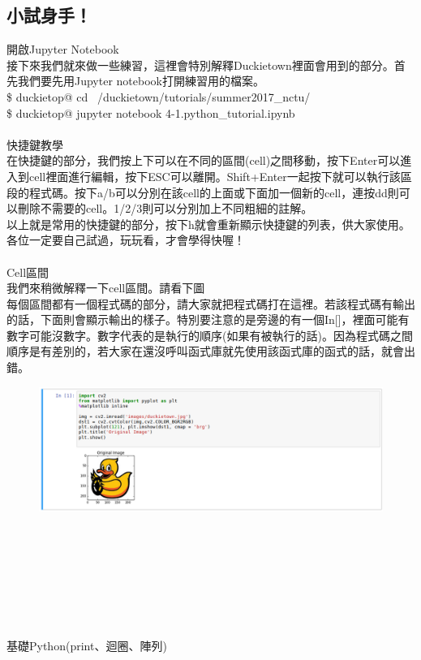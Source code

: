\documentclass{article}
\begin{document}
\subsection{小試身手！}
開啟Jupyter Notebook
\\接下來我們就來做一些練習，這裡會特別解釋Duckietown裡面會用到的部分。首先我們要先用Jupyter notebook打開練習用的檔案。
\\\$ duckietop@ cd ~/duckietown/tutorials/summer2017\_nctu/
\\\$ duckietop@ jupyter notebook 4-1.python\_tutorial.ipynb
\\\\快捷鍵教學
\\在快捷鍵的部分，我們按上下可以在不同的區間(cell)之間移動，按下Enter可以進入到cell裡面進行編輯，按下ESC可以離開。Shift+Enter一起按下就可以執行該區段的程式碼。按下a/b可以分別在該cell的上面或下面加一個新的cell，連按dd則可以刪除不需要的cell。1/2/3則可以分別加上不同粗細的註解。
\\以上就是常用的快捷鍵的部分，按下h就會重新顯示快捷鍵的列表，供大家使用。各位一定要自己試過，玩玩看，才會學得快喔！
\\\\Cell區間
\\我們來稍微解釋一下cell區間。請看下圖
\\每個區間都有一個程式碼的部分，請大家就把程式碼打在這裡。若該程式碼有輸出的話，下面則會顯示輸出的樣子。特別要注意的是旁邊的有一個In[]，裡面可能有數字可能沒數字。數字代表的是執行的順序(如果有被執行的話)。因為程式碼之間順序是有差別的，若大家在還沒呼叫函式庫就先使用該函式庫的函式的話，就會出錯。
\\
\begin{figure}[htp]
    \begin{center}
        \includegraphics[width=450pt]{pic/3_1_1.png}
    \end{center}
\end{figure}
\\
\\\\\\\\\\\\基礎Python(print、迴圈、陣列)
\end{document}
